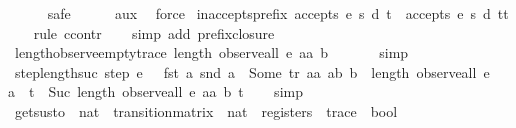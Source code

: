 \begin{isabellebody}
\ \ \ \ \isamarkupfalse%
\ safe\isanewline
\ \ \ \ \isamarkupfalse%
\ aux{}\ \isamarkupfalse%
\ force\isanewline
{}\isamarkupfalse%
%
\endisatagproof
{\isafoldproof}%
%
\isadelimproof
\isanewline
%
\endisadelimproof
\isanewline
{}\isamarkupfalse%
\ inaccepts{\isacharunderscore}prefix{\isacharcolon}\ {\isachardoublequoteopen}{\isasymnot}accepts\ e\ s\ d\ t\ {\isasymLongrightarrow}\ {\isasymnot}accepts\ e\ s\ d\ {\isacharparenleft}t{\isacharat}t{\isacharprime}{\isacharparenright}{\isachardoublequoteclose}\isanewline
%
\isadelimproof
\ \ %
\endisadelimproof
%
\isatagproof
{}\isamarkupfalse%
\ {\isacharparenleft}rule\ ccontr{\isacharparenright}\isanewline
\ \ \isamarkupfalse%
\ {\isacharparenleft}simp\ add{\isacharcolon}\ prefix{\isacharunderscore}closure{\isacharparenright}%
\endisatagproof
{\isafoldproof}%
%
\isadelimproof
\isanewline
%
\endisadelimproof
\isanewline
{}\isamarkupfalse%
\ length{\isacharunderscore}observe{\isacharunderscore}empty{\isacharunderscore}trace{\isacharcolon}\ {\isachardoublequoteopen}length\ {\isacharparenleft}observe{\isacharunderscore}all\ e\ aa\ b\ {\isacharbrackleft}{\isacharbrackright}{\isacharparenright}\ {\isacharequal}\ {}{\isachardoublequoteclose}\isanewline
%
\isadelimproof
\ \ %
\endisadelimproof
%
\isatagproof
{}\isamarkupfalse%
\ simp%
\endisatagproof
{\isafoldproof}%
%
\isadelimproof
\isanewline
%
\endisadelimproof
\isanewline
{}\isamarkupfalse%
\ step{\isacharunderscore}length{\isacharunderscore}suc{\isacharcolon}\ {\isachardoublequoteopen}step\ e\ {}\ {\isacharless}{\isachargreater}\ {\isacharparenleft}fst\ a{\isacharparenright}\ {\isacharparenleft}snd\ a{\isacharparenright}\ {\isacharequal}\ Some\ {\isacharparenleft}tr{\isacharcomma}\ aa{\isacharcomma}\ ab{\isacharcomma}\ b{\isacharparenright}\ {\isasymLongrightarrow}\ length\ {\isacharparenleft}observe{\isacharunderscore}all\ e\ {}\ {\isacharless}{\isachargreater}\ {\isacharparenleft}a\ {\isacharhash}\ t{\isacharparenright}{\isacharparenright}\ {\isacharequal}\ Suc\ {\isacharparenleft}length\ {\isacharparenleft}observe{\isacharunderscore}all\ e\ aa\ b\ t{\isacharparenright}{\isacharparenright}{\isachardoublequoteclose}\isanewline
%
\isadelimproof
\ \ %
\endisadelimproof
%
\isatagproof
{}\isamarkupfalse%
\ simp%
\endisatagproof
{\isafoldproof}%
%
\isadelimproof
\isanewline
%
\endisadelimproof
\isanewline
{}\isamarkupfalse%
\ gets{\isacharunderscore}us{\isacharunderscore}to\ {\isacharcolon}{\isacharcolon}\ {\isachardoublequoteopen}nat\ {\isasymRightarrow}\ transition{\isacharunderscore}matrix\ {\isasymRightarrow}\ nat\ {\isasymRightarrow}\ registers\ {\isasymRightarrow}\ trace\ {\isasymRightarrow}\ bool{\isachardoublequoteclose}\ \isanewline

\end{isabellebody}
